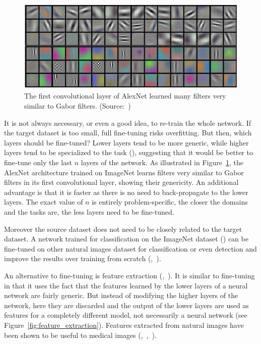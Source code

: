 \begin{figure}[htbp]
    \centering
	\includegraphics[width=\textwidth]{img_transfer/alexnet_gabor}
    \caption[Gabor filters learned by AlexNet]{The first convolutional layer of AlexNet learned many filters very similar to Gabor filters. (Source:~\textcite{krizhevsky2012NIPS})}
    \label{fig:alexnet_gabor}
\end{figure}

It is not always necessary, or even a good idea, to re-train the whole network. If the target dataset is too small, full fine-tuning risks overfitting. But then, which layers should be fine-tuned? Lower layers tend to be more generic, while higher layers tend to be specialized to the task (\textcite{yosinski2014NIPS}), suggesting that it would be better to fine-tune only the last $n$ layers of the network. As illustrated in Figure~\ref{fig:alexnet_gabor}, the AlexNet architecture trained on ImageNet learns filters very similar to Gabor filters in its first convolutional layer, showing their genericity. An additional advantage is that it is faster as there is no need to back-propagate to the lower layers. The exact value of $n$ is entirely problem-specific, the closer the domains and the tasks are, the less layers need to be fine-tuned.

Moreover the source dataset does not need to be closely related to the target dataset. A network trained for classification on the ImageNet dataset (\textcite{imagenet}) can be fine-tuned on other natural images dataset for classification or even detection and improve the results over training from scratch (\textcite{oquab2014CVPR},~\textcite{razavian2014CVPR}).

An alternative to fine-tuning is feature extraction (\textcite{donahue14PMLR},~\textcite{sermanet2014ICLR}). It is similar to fine-tuning in that it uses the fact that the features learned by the lower layers of a neural network are fairly generic. But instead of modifying the higher layers of the network, here they are discarded and the output of the lower layers are used as features for a completely different model, not necessarily a neural network (see Figure~\ref{fig:feature_extraction}). Features extracted from natural images have been shown to be useful to medical images (\textcite{shin2016},~\textcite{bar2015ISBI},~\textcite{vanginneken2015ISBI}).

